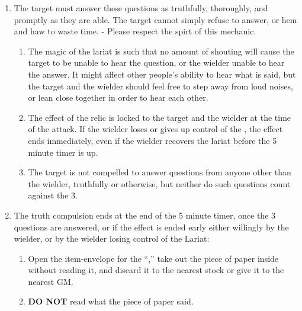 \documentclass[green]{GL2020}
\begin{document}
\begin{enumerate}
\begin{enumerate}
  \end{enumerate}
  \item The target must answer these questions as truthfully, thoroughly, and promptly as they are able. The target cannot simply refuse to answer, or hem and haw to waste time. - Please respect the spirt of this mechanic.
    \begin{enumerate}
    \item The magic of the lariat is such that no amount of shouting will cause the target to be unable to hear the question, or the wielder unable to hear the answer. It might affect other people’s ability to hear what is said, but the target and the wielder should feel free to step away from loud noises, or lean close together in order to hear each other.
    \item The effect of the relic is locked to the target and the wielder at the time of the attack. If the wielder loses or gives up control of the \iLariat{}, the effect ends immediately, even if the wielder recovers the lariat before the 5 minute timer is up.
    \item The target is not compelled to answer questions from anyone other than the wielder, truthfully or otherwise, but neither do such questions count against the 3.
  \end{enumerate}
  \item The truth compulsion ends at the end of the 5 minute timer, once the 3 questions are answered, or if the effect is ended early either willingly by the wielder, or by the wielder losing control of the Lariat:
  \begin{enumerate}
    \item Open the item-envelope for the ``\iLariat{},'' take out the piece of paper inside without reading it, and discard it to the nearest stock or give it to the nearest GM.
    \item \textbf{DO NOT} read what the piece of paper said.
  \end{enumerate}
\end{enumerate}
\end{document}
